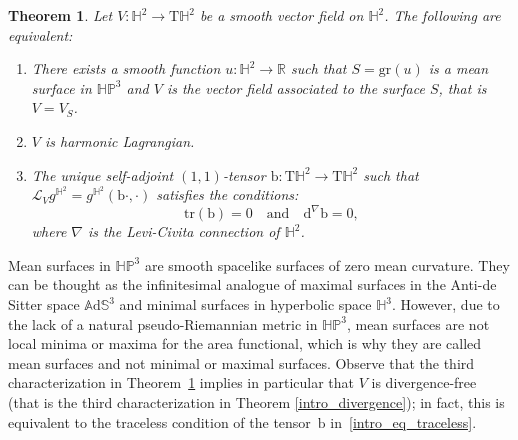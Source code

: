 \documentclass[10pt]{amsart}
\theoremstyle{plain}
\newtheorem{theorem}[cor]{Theorem}
\theoremstyle{definition}
\newcommand{\bb}{\mathrm{b}}
\newcommand{\ads}{\mathbb{A}\mathrm{d}\mathbb{S}^3}
\newcommand{\HP}{\mathbb{HP}^3}
\begin{document}
\begin{theorem}\label{intro_chara}
Let \(V: \mathbb{H}^2 \to \mathrm{T}\mathbb{H}^2\) be a smooth vector field on \(\mathbb{H}^2\). The following are equivalent:
\begin{enumerate}
\item There exists a smooth function \(u: \mathbb{H}^2 \to \mathbb{R}\) such that \(S=\mathrm{gr}(u)\) is a mean surface in \(\HP\) and \(V\) is the vector field associated to the surface \(S\), that is \(V = V_S\).
\item \(V\) is harmonic Lagrangian.
\item The unique self-adjoint \((1, 1)\)-tensor \(\bb: \mathrm{T}\mathbb{H}^2 \to \mathrm{T}\mathbb{H}^2\) such that \(\mathcal{L}_V g^{\mathbb{H}^2} = g^{\mathbb{H}^2}(\bb \cdot, \cdot)\) satisfies the conditions:
\begin{equation}\label{intro_eq_traceless}
\mathrm{tr}(\bb) = 0 \quad \text{and} \quad \mathrm{d}^{\nabla} \bb = 0,
\end{equation}
where \(\nabla\) is the Levi-Civita connection of \(\mathbb{H}^2\).
\end{enumerate}
\end{theorem}
Mean surfaces in \(\HP\) are smooth spacelike surfaces of zero mean curvature. They can be thought as the infinitesimal analogue of maximal surfaces in the Anti-de Sitter space \(\ads\) and minimal surfaces in hyperbolic space $\mathbb{H}^3$. However, due to the lack of a natural pseudo-Riemannian metric in \(\HP\), mean surfaces are not local minima or maxima for the area functional, which is why they are called mean surfaces and not minimal or maximal surfaces. Observe that the third characterization in Theorem~\ref{intro_chara} implies in particular that \(V\) is divergence-free (that is the third characterization in Theorem \ref{intro_divergence}); in fact, this is equivalent to the traceless condition of the tensor~\(\bb\) in~\eqref{intro_eq_traceless}.
\end{document}
